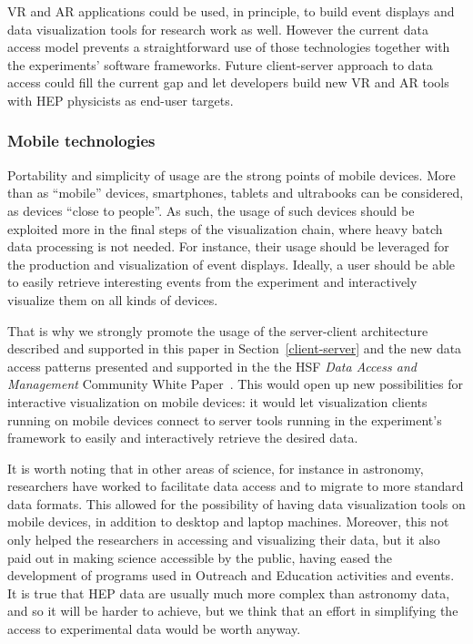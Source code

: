 \documentclass[12pt,a4paper]{article}
\begin{document}
VR and AR applications could be used, in principle, to build event displays and data visualization tools for research work as well.
However the current data access model prevents a straightforward use of those technologies together with the experiments' software frameworks.
Future client-server approach to data access could fill the current gap and let developers build new VR and AR tools with HEP physicists as end-user targets.

\hypertarget{mobile-tech}{%
\subsubsection{Mobile technologies}\label{mobile-tech}}

Portability and simplicity of usage are the strong points of mobile devices. More than as ``mobile'' devices, smartphones,
tablets and ultrabooks can be considered, as devices ``close to people''. As such, the usage of such devices
should be exploited more in the final steps of the visualization chain, where heavy batch data processing is not needed. For instance,
their usage should be leveraged for the production and visualization of event displays.
Ideally, a user should be able to easily retrieve interesting events from the experiment and interactively visualize them on all
kinds of devices.

That is why we strongly promote the usage of the server-client architecture described and supported in this paper in Section~\ref{client-server}
and the new data access patterns presented and supported in the the HSF \textit{Data Access and Management} Community White Paper~\cite{HSF-CWP-2017-04}. %
This would open up new possibilities for interactive visualization on mobile devices: it would let visualization clients running on mobile devices
connect to server tools running in the experiment's framework to easily and interactively retrieve the desired data.

It is worth noting that in other areas of science, for instance in astronomy, researchers have worked to facilitate data
access and to migrate to more standard data formats. This allowed for the possibility of having data visualization tools
on mobile devices, in addition to desktop and laptop machines. Moreover, this not only helped the researchers in accessing and visualizing
their data, but it also paid out in making science accessible by the public, having eased the development of programs used in
Outreach and Education activities and events. It is true that HEP data are usually much more complex than astronomy data, and so it
will be harder to achieve, but we think that an effort in simplifying the access to experimental data would be worth anyway.
\end{document}
